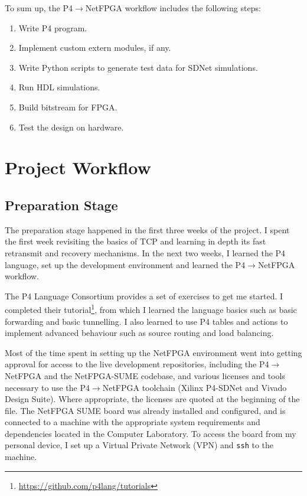 To sum up, the P4$\rightarrow$NetFPGA workflow includes the following steps:
\begin{enumerate}[label=(\arabic*)]
	\item Write P4 program.
	\item Implement custom extern modules, if any.
	\item Write Python scripts to generate test data for SDNet simulations.
	\item Run HDL simulations.
	\item Build bitstream for FPGA.
	\item Test the design on hardware.
\end{enumerate}

\section{Project Workflow}
\subsection{Preparation Stage}
The preparation stage happened in the first three weeks of the project. I spent the first week revisiting the basics of TCP and learning in depth its fast retransmit and recovery mechanisms. In the next two weeks, I learned the P4 language, set up the development environment and learned the P4$\rightarrow$NetFPGA workflow.

The P4 Language Consortium \cite{p4.org} provides a set of exercises to get me started. I completed their tutorial\footnote{\url{https://github.com/p4lang/tutorials}}, from which I learned the language basics such as basic forwarding and basic tunnelling. I also learned to use P4 tables and actions to implement advanced behaviour such as source routing and load balancing. 

Most of the time spent in setting up the NetFPGA environment went into getting approval for access to the live development repositories, including the P4$\rightarrow$NetFPGA and the NetFPGA-SUME codebase, and various licenses and tools necessary to use the P4$\rightarrow$NetFPGA toolchain (Xilinx P4-SDNet and Vivado Design Suite). Where appropriate, the licenses are quoted at the beginning of the file. The NetFPGA SUME board was already installed and configured, and is connected to a machine with the appropriate system requirements and dependencies located in the Computer Laboratory. To access the board from my personal device, I set up a Virtual Private Network (VPN) and \texttt{ssh} to the machine.

